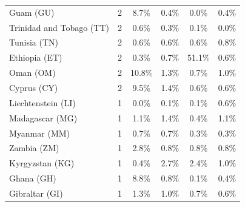 {\begin{table}[ht]
{\begin{tabular}{lccccc}
Guam (GU)             &     2  & \cellcolor{red5}  8.7\% & \cellcolor{green1} 0.4\% & \cellcolor{green1} 0.0\% & \cellcolor{green1} 0.4\% \\  %
Trinidad and Tobago (TT)  &     2  & \cellcolor{red5}  0.6\% & \cellcolor{red2} 0.3\% & 0.1\% & \cellcolor{green2} 0.0\% \\  %
Tunisia (TN)          &     2  & \cellcolor{red1} 0.6\% & \cellcolor{red1} 0.6\% & \cellcolor{red1} 0.6\% & \cellcolor{red5}  0.8\% \\  %
Ethiopia (ET)         &     2  & \cellcolor{green0} 0.3\% & \cellcolor{green0} 0.7\% & \cellcolor{red5}  51.1\% & \cellcolor{green0} 0.6\% \\  %
Oman (OM)             &     2  & \cellcolor{red5}  10.8\% & 1.3\% & \cellcolor{green0} 0.7\% & 1.0\% \\  %
Cyprus (CY)           &     2  & \cellcolor{red5}  9.5\% & 1.4\% & \cellcolor{green0} 0.6\% & \cellcolor{green0} 0.6\% \\  %
Liechtenstein (LI)    &     1  & \cellcolor{green5}  0.0\% & \cellcolor{green0} 0.1\% & \cellcolor{green0} 0.1\% & \cellcolor{red5}  0.6\% \\  %
Madagascar (MG)       &     1  & \cellcolor{red0} 1.1\% & \cellcolor{red5}  1.4\% & \cellcolor{green5}  0.4\% & \cellcolor{red0} 1.1\% \\  %
Myanmar (MM)          &     1  & \cellcolor{red5}  0.7\% & \cellcolor{red5}  0.7\% & \cellcolor{green5}  0.3\% & \cellcolor{green5}  0.3\% \\  %
Zambia (ZM)           &     1  & \cellcolor{red5}  2.8\% & \cellcolor{green1} 0.8\% & \cellcolor{green1} 0.8\% & \cellcolor{green1} 0.8\% \\  %
Kyrgyzstan (KG)       &     1  & \cellcolor{green5}  0.4\% & \cellcolor{red5}  2.7\% & \cellcolor{red2} 2.4\% & \cellcolor{green1} 1.0\% \\  %
Ghana (GH)            &     1  & \cellcolor{red5}  8.8\% & \cellcolor{green0} 0.8\% & \cellcolor{green1} 0.1\% & \cellcolor{green1} 0.4\% \\  %
Gibraltar (GI)        &     1  & \cellcolor{red5}  1.3\% & \cellcolor{red0} 1.0\% & \cellcolor{green1} 0.7\% & \cellcolor{green5}  0.6\% \\  %

\end{tabular}}
\end{table}}
